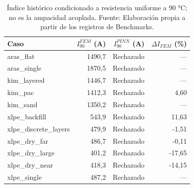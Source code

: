 \begin{table}[htbp]
\centering
\caption{Índice histórico condicionado a resistencia uniforme a 90 °C; no es la ampacidad acoplada. Fuente: Elaboración propia a partir de los registros de Benchmarks.}
\label{tab:indice-condicional}
\begin{tabularx}{\textwidth}{Yrrr}
\toprule
Caso & $I_{90}^{FEM}$ (A) & $I_{90}^{PINN}$ (A) & $\Delta I_{FEM}$ (\%) \\
\midrule
aras\_\allowbreak flat & 1490,7 & Rechazado & --- \\
aras\_\allowbreak single & 1870,5 & Rechazado & --- \\
kim\_\allowbreak layered & 1446,7 & Rechazado & --- \\
kim\_\allowbreak pac & 1412,3 & Rechazado & 4,60 \\
kim\_\allowbreak sand & 1350,2 & Rechazado & --- \\
xlpe\_\allowbreak backfill & 543,9 & Rechazado & 11,63 \\
xlpe\_\allowbreak discrete\_\allowbreak layers & 479,9 & Rechazado & -1,51 \\
xlpe\_\allowbreak dry\_\allowbreak far & 486,7 & Rechazado & -0,11 \\
xlpe\_\allowbreak dry\_\allowbreak large & 401,2 & Rechazado & -17,65 \\
xlpe\_\allowbreak dry\_\allowbreak near & 418,3 & Rechazado & -14,15 \\
xlpe\_\allowbreak single & 487,2 & Rechazado & --- \\
\bottomrule
\end{tabularx}
\end{table}
